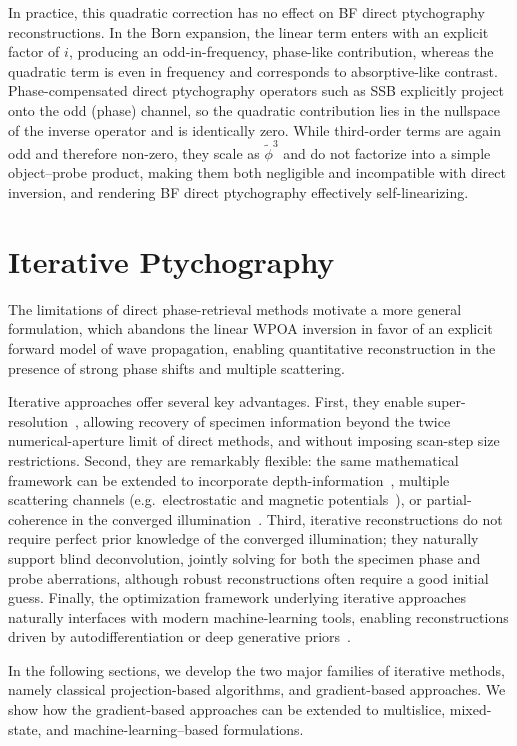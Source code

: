 \documentclass[pdflatex,sn-aps,iicol]{sn-jnl}%
\begin{document}
In practice, this quadratic correction has no effect on BF direct ptychography reconstructions.
In the Born expansion, the linear term enters with an explicit factor of $i$, producing an odd-in-frequency, phase-like contribution, whereas the quadratic term is even in frequency and corresponds to absorptive-like contrast.
Phase-compensated direct ptychography operators such as SSB explicitly project onto the odd (phase) channel, so the quadratic contribution lies in the nullspace of the inverse operator and is identically zero.
While third-order terms are again odd and therefore non-zero, they scale as $\tilde{\phi}^3$ and do not factorize into a simple object–probe product, making them both negligible and incompatible with direct inversion, and rendering BF direct ptychography effectively self-linearizing.

\section{Iterative Ptychography}
\label{sec:iterative}

The limitations of direct phase-retrieval methods motivate a more general formulation, which abandons the linear WPOA inversion in favor of an explicit forward model of wave propagation, enabling quantitative reconstruction in the presence of strong phase shifts and multiple scattering.

Iterative approaches offer several key advantages.
First, they enable super-resolution~\cite{Maiden_2009}, allowing recovery of specimen information beyond the twice numerical-aperture limit of direct methods, and without imposing scan-step size restrictions.
Second, they are remarkably flexible: the same mathematical framework can be extended to incorporate depth-information~\cite{Chen_2021}, multiple scattering channels (e.g.\ electrostatic and magnetic potentials~\cite{Varnavides_2023_mag}), or partial-coherence in the converged illumination~\cite{Thibault_2013}.
Third, iterative reconstructions do not require perfect prior knowledge of the converged illumination; they naturally support blind deconvolution, jointly solving for both the specimen phase and probe aberrations, although robust reconstructions often require a good initial guess.
Finally, the optimization framework underlying iterative approaches naturally interfaces with modern machine-learning tools, enabling reconstructions driven by autodifferentiation or deep generative priors~\cite{Lee_2025,Gilgenbach_2025,McCray_2025}.

In the following sections, we develop the two major families of iterative methods, namely classical projection-based algorithms, and gradient-based approaches.
We show how the gradient-based approaches can be extended to multislice, mixed-state, and machine-learning–based formulations.
\end{document}
